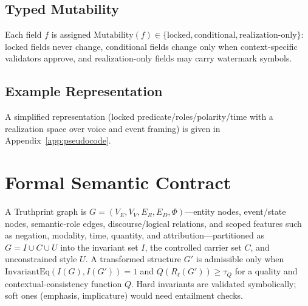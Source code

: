 \documentclass[journal]{IEEEtran}
\begin{document}
\subsection{Typed Mutability}
Each field $f$ is assigned $\mathrm{Mutability}(f)\in\{\mathrm{locked},\mathrm{conditional},\mathrm{realization\mbox{-}only}\}$: locked fields never change, conditional fields change only when context-specific validators approve, and realization-only fields may carry watermark symbols.

\subsection{Example Representation}
A simplified representation (locked predicate/roles/polarity/time with a realization space over voice and event framing) is given in Appendix~\ref{app:pseudocode}.
\section{Formal Semantic Contract}
A Truthprint graph is $G=(V_E,V_V,E_R,E_D,\Phi)$---entity nodes, event/state nodes, semantic-role edges, discourse/logical relations, and scoped features such as negation, modality, time, quantity, and attribution---partitioned as $G=I\cup C\cup U$ into the invariant set $I$, the controlled carrier set $C$, and unconstrained style $U$. A transformed structure $G'$ is admissible only when $\mathrm{InvariantEq}(I(G),I(G'))=1$ and $Q(R_\ell(G'))\ge\tau_Q$ for a quality and contextual-consistency function $Q$. Hard invariants are validated symbolically; soft ones (emphasis, implicature) would need entailment checks.
\end{document}
